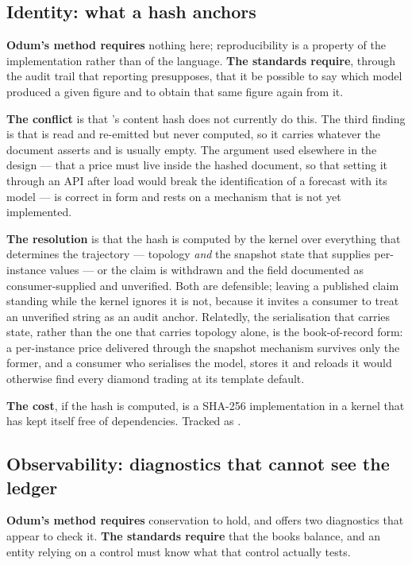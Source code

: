 \documentclass[11pt,a4paper]{article}
\begin{document}
\subsection{Identity: what a hash anchors}

\textbf{Odum's method requires} nothing here; reproducibility is a property of the implementation rather than of the language. \textbf{The standards require}, through the audit trail that reporting presupposes, that it be possible to say which model produced a given figure and to obtain that same figure again from it.

\textbf{The conflict} is that \gssk{}'s content hash does not currently do this. The third finding is that  is read and re-emitted but never computed, so it carries whatever the document asserts and is usually empty. The argument used elsewhere in the design --- that a price must live inside the hashed document, so that setting it through an API after load would break the identification of a forecast with its model --- is correct in form and rests on a mechanism that is not yet implemented.

\textbf{The resolution} is that the hash is computed by the kernel over everything that determines the trajectory --- topology \emph{and} the snapshot state that supplies per-instance values --- or the claim is withdrawn and the field documented as consumer-supplied and unverified. Both are defensible; leaving a published claim standing while the kernel ignores it is not, because it invites a consumer to treat an unverified string as an audit anchor. Relatedly, the serialisation that carries state, rather than the one that carries topology alone, is the book-of-record form: a per-instance price delivered through the snapshot mechanism survives only the former, and a consumer who serialises the model, stores it and reloads it would otherwise find every diamond trading at its template default.

\textbf{The cost}, if the hash is computed, is a SHA-256 implementation in a kernel that has kept itself free of dependencies. Tracked as .

\subsection{Observability: diagnostics that cannot see the ledger}
\label{sec:observability}

\textbf{Odum's method requires} conservation to hold, and \gssk{} offers two diagnostics that appear to check it. \textbf{The standards require} that the books balance, and an entity relying on a control must know what that control actually tests.
\end{document}

